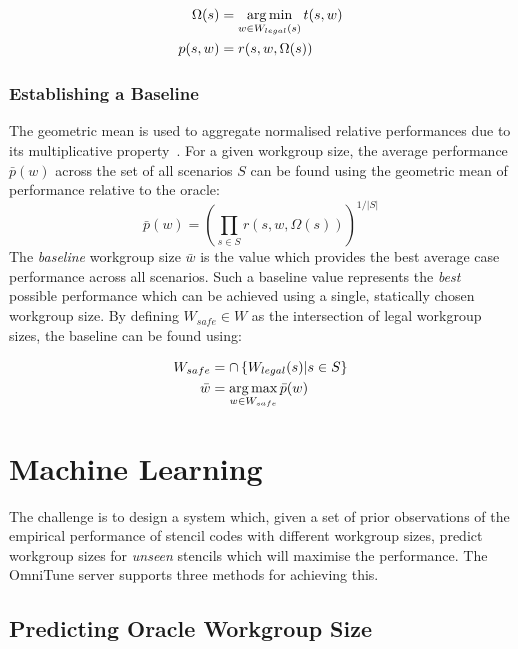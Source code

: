 \begin{align}
  \Omega(s) &= \operatorname*{arg\,min}_{w \in W_{legal}(s)} t(s,w)\\
  p(s,w) &= r(s, w, \Omega(s))
\end{align}


\subsubsection{Establishing a Baseline}

The geometric mean is used to aggregate normalised relative
performances due to its multiplicative
property~\cite{Fleming1986}. For a given workgroup size, the average
performance $\bar{p}(w)$ across the set of all scenarios $S$ can be
found using the geometric mean of performance relative to the oracle:
%
\begin{equation}
  \bar{p}(w) =
  \left(
  \prod_{s \in S} r(s, w, \Omega(s))
  \right)^{1/|S|}
\end{equation}
%
The \emph{baseline} workgroup size $\bar{w}$ is the value which
provides the best average case performance across all scenarios. Such
a baseline value represents the \emph{best} possible performance which
can be achieved using a single, statically chosen workgroup size. By
defining $W_{safe} \in W$ as the intersection of legal workgroup
sizes, the baseline can be found using:

\begin{align}
  W_{safe} &= \cap \left\{ W_{legal}(s) | s \in S \right\}\\
  \bar{w} &= \operatorname*{arg\,max}_{w \in W_{safe}} \bar{p}(w)
\end{align}


\section{Machine Learning}\label{sec:omnitune-ml}

The challenge is to design a system which, given a set of prior
observations of the empirical performance of stencil codes with
different workgroup sizes, predict workgroup sizes for \emph{unseen}
stencils which will maximise the performance. The OmniTune server
supports three methods for achieving this.


\subsection{Predicting Oracle Workgroup Size}\label{subsec:omnitune-ml-class}

